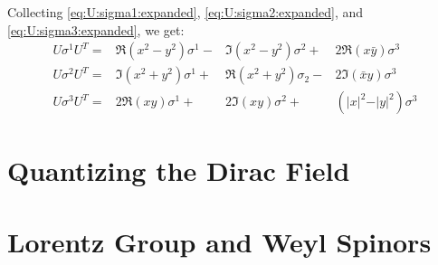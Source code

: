 \documentclass[]{article}
\begin{document}
Collecting \eqref{eq:U:sigma1:expanded}, \eqref{eq:U:sigma2:expanded}, and \eqref{eq:U:sigma3:expanded}, we get:
\begin{equation}
	\begin{aligned}
		U \sigma^1 U^T  =& \Re{(x^2-y^2)} \sigma^1 -& \Im{(x^2-y^2)} \sigma^2 +& 2 \Re({x\bar{y}}) \sigma^3\\
		U \sigma^2 U^T  =& \Im(x^2 + y^2) \sigma^1 +& \Re(x^2+y^2) \sigma_2 -& 2 \Im({\bar{x}y}) \sigma^3  \\
		U \sigma^3 U^T =&  2 \Re(xy) \sigma^1 +& 2 \Im(xy) \sigma^2 +& (\vert x \vert^2 - \vert y \vert^2) \sigma^3
	\end{aligned}\label{eq:all3sigma}
\end{equation}

\section{Quantizing the Dirac Field}
\section{Lorentz Group and Weyl Spinors}
\end{document}
